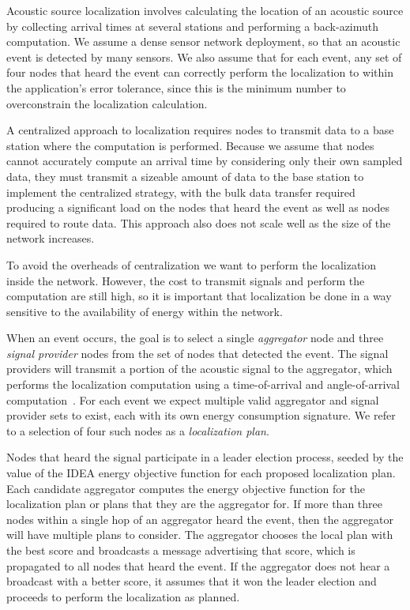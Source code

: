 Acoustic source localization involves calculating the location of an acoustic
source by collecting arrival times at several stations and performing a
back-azimuth computation. We assume a dense sensor network deployment, so
that an acoustic event is detected by many sensors. We also assume that for
each event, any set of four nodes that heard the event can correctly perform
the localization to within the application's error tolerance, since this is
the minimum number to overconstrain the localization calculation.

A centralized approach to localization requires nodes to transmit data to a
base station where the computation is performed. Because we assume that nodes
cannot accurately compute an arrival time by considering only their own
sampled data, they must transmit a sizeable amount of data to the base
station to implement the centralized strategy, with the bulk data transfer
required producing a significant load on the nodes that heard the event as
well as nodes required to route data. This approach also does not scale well
as the size of the network increases.

To avoid the overheads of centralization we want to perform the localization
inside the network. However, the cost to transmit signals and perform the
computation are still high, so it is important that localization be done in a
way sensitive to the availability of energy within the network.

When an event occurs, the goal is to select a single \textit{aggregator} node
and three \textit{signal provider} nodes from the set of nodes that detected
the event. The signal providers will transmit a portion of the acoustic
signal to the aggregator, which performs the localization computation using a
time-of-arrival and angle-of-arrival computation~\cite{Niculescu03adhoc}.
For each event we expect multiple valid aggregator and signal provider sets
to exist, each with its own energy consumption signature. We refer to a
selection of four such nodes as a \textit{localization plan}. 

Nodes that heard the signal participate in a leader election process, seeded
by the value of the IDEA energy objective function for each proposed
localization plan. Each candidate aggregator computes the energy objective
function for the localization plan or plans that they are the aggregator for.
If more than three nodes within a single hop of an aggregator heard the
event, then the aggregator will have multiple plans to consider. The
aggregator chooses the local plan with the best score and broadcasts a
message advertising that score, which is propagated to all nodes that heard
the event. If the aggregator does not hear a broadcast with a better score,
it assumes that it won the leader election and proceeds to perform the
localization as planned. 
